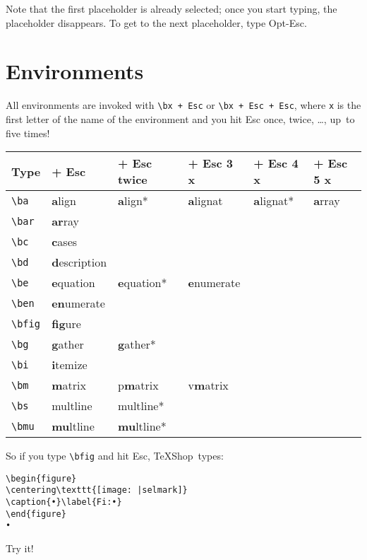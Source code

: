 \documentclass[letterpaper,11pt]{article}
\newcommand{\TS}{\textsf{\TeX Shop}}
\newcommand{\cmd}[1]{\textsf{#1}}
\begin{document}
Note that the first placeholder is already selected; once you start
typing, the placeholder disappears. To get to the next placeholder, type \cmd{Opt-Esc}.

\section{Environments}

All environments are invoked 
with \verb!\bx + Esc! or \verb!\bx + Esc + Esc!, 
where \verb|x| is the first letter of the name of the environment
and you hit \cmd{Esc} once, twice, \dots, up~to five times!

\medskip

\noindent \begin{tabular}{l|l|l|l|l|l}
Type & + \cmd{Esc} & + \cmd{Esc} twice & + \cmd{Esc} 3 x & + \cmd{Esc} 4 x & + \cmd{Esc} 5 x\\\hline
\verb|\ba| & \textbf{a}lign & \textbf{a}lign*&\textbf{a}lignat&\textbf{a}lignat*&\textbf{a}rray\\
\verb|\bar|&\textbf{ar}ray&&\\
\verb|\bc| & \textbf{c}ases&&\\
\verb|\bd| & \textbf{d}escription&&\\
\verb|\be| & \textbf{e}quation & \textbf{e}quation*&\textbf{e}numerate\\
\verb|\ben|&\textbf{en}umerate&&\\
\verb|\bfig|&\textbf{fig}ure&&\\
\verb|\bg| & \textbf{g}ather & \textbf{g}ather*&\\
\verb|\bi| & \textbf{i}temize&&\\
\verb|\bm| & \textbf{m}atrix & p\textbf{m}atrix&v\textbf{m}atrix\\
\verb|\bs| & multline & multline*\\
\verb|\bmu| & \textbf{mu}ltline & \textbf{mu}ltline*\\
\end{tabular}

\medskip

\noindent So if you type \verb|\bfig| and hit \cmd{Esc}, \TS\ types:
\begin{verbatim}
\begin{figure}
\centering\texttt{[image: |selmark]}
\caption{•}\label{Fi:•}
\end{figure}
•
\end{verbatim}
Try it!
\end{document}
